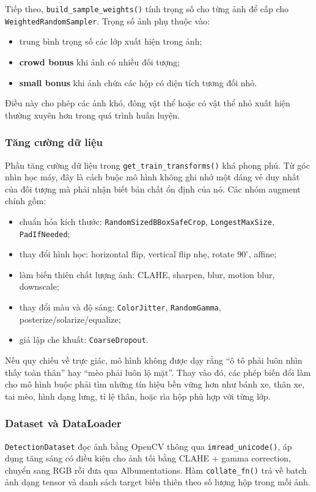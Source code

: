 \documentclass[12pt,a4paper]{article}
\begin{document}
Tiếp theo, \texttt{build\_sample\_weights()} tính trọng số cho từng ảnh để cấp cho \texttt{WeightedRandomSampler}. Trọng số ảnh phụ thuộc vào:
\begin{itemize}
    \item trung bình trọng số các lớp xuất hiện trong ảnh;
    \item \textbf{crowd bonus} khi ảnh có nhiều đối tượng;
    \item \textbf{small bonus} khi ảnh chứa các hộp có diện tích tương đối nhỏ.
\end{itemize}

Điều này cho phép các ảnh khó, đông vật thể hoặc có vật thể nhỏ xuất hiện thường xuyên hơn trong quá trình huấn luyện.

\subsubsection{Tăng cường dữ liệu}
Phần tăng cường dữ liệu trong \texttt{get\_train\_transforms()} khá phong phú. Từ góc nhìn học máy, đây là cách buộc mô hình không ghi nhớ một dáng vẻ duy nhất của đối tượng mà phải nhận biết bản chất ổn định của nó. Các nhóm augment chính gồm:
\begin{itemize}
    \item chuẩn hóa kích thước: \texttt{RandomSizedBBoxSafeCrop}, \texttt{LongestMaxSize}, \texttt{PadIfNeeded};
    \item thay đổi hình học: horizontal flip, vertical flip nhẹ, rotate $90^\circ$, affine;
    \item làm biến thiên chất lượng ảnh: CLAHE, sharpen, blur, motion blur, downscale;
    \item thay đổi màu và độ sáng: \texttt{ColorJitter}, \texttt{RandomGamma}, posterize/solarize/equalize;
    \item giả lập che khuất: \texttt{CoarseDropout}.
\end{itemize}

Nếu quy chiếu về trực giác, mô hình không được dạy rằng ``ô tô phải luôn nhìn thấy toàn thân'' hay ``mèo phải luôn lộ mặt''. Thay vào đó, các phép biến đổi làm cho mô hình buộc phải tìm những tín hiệu bền vững hơn như bánh xe, thân xe, tai mèo, hình dạng lưng, tỉ lệ thân, hoặc rìa hộp phù hợp với từng lớp.

\subsubsection{Dataset và DataLoader}
\texttt{DetectionDataset} đọc ảnh bằng OpenCV thông qua \texttt{imread\_unicode()}, áp dụng tăng sáng có điều kiện cho ảnh tối bằng CLAHE + gamma correction, chuyển sang RGB rồi đưa qua Albumentations. Hàm \texttt{collate\_fn()} trả về batch ảnh dạng tensor và danh sách target biến thiên theo số lượng hộp trong mỗi ảnh.
\end{document}
